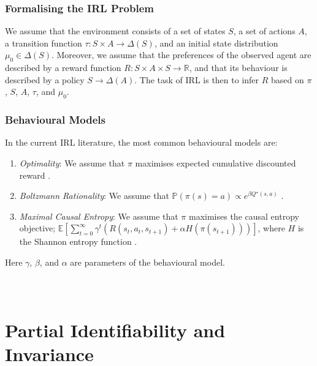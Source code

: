\documentclass{beamer}
\begin{document}
\begin{frame}
    \frametitle{Formalising the IRL Problem}
    \small
    We assume that the environment consists of a set of states $S$, a set of actions $A$, a transition function $\tau : S \times A \to \Delta(S)$, and an initial state distribution $\mu_0 \in \Delta(S)$. 
    \newline\newline
    Moreover, we assume that the preferences of the observed agent are described by a reward function $R : S \times A \times S \to \mathbb{R}$, and that its behaviour is described by a policy $S \to \Delta(A)$.
    \newline\newline
    The task of IRL is then to infer $R$ based on $\pi$, $S$, $A$, $\tau$, and $\mu_0$.
\end{frame}

\begin{frame}
    \frametitle{Behavioural Models}
    \small
    In the current IRL literature, the most common behavioural models are:
    \vspace{0.2cm}
    \begin{enumerate}
        \item \emph{Optimality}: We assume that $\pi$ maximises expected cumulative discounted reward \citep{ng2000}.
        \item \emph{Boltzmann Rationality}: We assume that $\mathbb{P}(\pi(s) = a) \propto e^{\beta Q^\star(s,a)}$ \citep{ramachandran2007}. 
        \item \emph{Maximal Causal Entropy}: We assume that $\pi$ maximises the causal entropy objective; $\mathbb{E}[\sum_{t=0}^{\infty} \gamma^t (R(s_t, a_t, s_{t+1}) + \alpha H(\pi(s_{t+1})))]$, where $H$ is the Shannon entropy function \citep{ziebart2010thesis}.
    \end{enumerate}
    \vspace{0.2cm}
    Here $\gamma$, $\beta$, and $\alpha$ are parameters of the behavioural model.
\end{frame}


\begin{frame}
    \frametitle{}
    \centering
    \Large
    \textcolor{white}{Partial Identifiability}
\end{frame}

\section{Partial Identifiability and Invariance}
\end{document}
